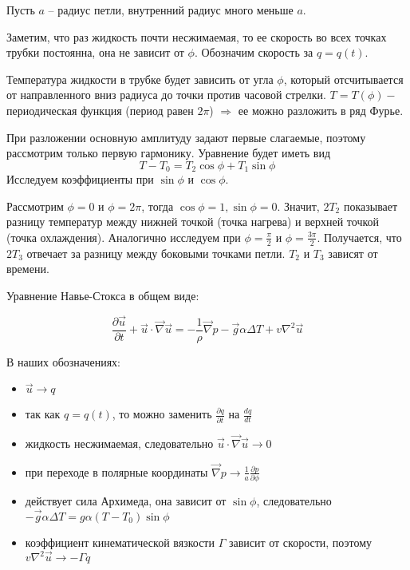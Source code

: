 \documentclass[12pt]{article}
\begin{document}

Пусть $a$ -- радиус петли, внутренний радиус много меньше $a$.

Заметим, что раз жидкость почти несжимаемая, то ее скорость во всех точках трубки постоянна, она не зависит от $\phi$. Обозначим скорость за $q = q(t)$.

Температура жидкости в трубке будет зависить от угла $\phi$, который отсчитывается от направленного вниз радиуса до точки против часовой стрелки. $T = T(\phi) -$ периодическая функция (период равен $2\pi$) $\Rightarrow$ ее можно разложить в ряд Фурье.

При разложении основную амплитуду задают первые слагаемые, поэтому рассмотрим только первую гармонику. Уравнение будет иметь вид 
\begin{equation}\label{eq1}
T - T_0 = T_2\cos\phi + T_1\sin\phi
\end{equation}
Исследуем коэффициенты при $\sin\phi$ и $\cos\phi$.

Рассмотрим $\phi = 0$ и $\phi = 2 \pi$, тогда $\cos\phi = 1, \sin\phi = 0$. Значит, $2T_2$ показывает разницу температур между нижней точкой (точка нагрева) и верхней точкой (точка охлаждения). Аналогично исследуем при $\phi = \frac{\pi}{2}$ и $\phi = \frac{3 \pi}{2}$. Получается, что $2T_3$ отвечает за разницу между боковыми точками петли. $T_2$ и $T_3$ зависят от времени.

Уравнение Навье-Стокса в общем виде:

\begin{equation*}
\frac{\partial \overrightarrow{u}}{\partial t} + \overrightarrow{u} \cdot \overrightarrow{\nabla} \overrightarrow{u} = -\frac{1}{\rho} \overrightarrow{\nabla} p - \overrightarrow{g} \alpha \Delta T + v \nabla^2 \overrightarrow{u}
\end{equation*}

В наших обозначениях:
\begin{itemize}
\item $\overrightarrow{u} \rightarrow q$
\item так как $q=q(t)$, то можно заменить $\frac{\partial q}{\partial t}$ на $\frac{dq}{dt}$
\item жидкость несжимаемая, следовательно $\overrightarrow{u} \cdot \overrightarrow{\nabla} \overrightarrow{u} \rightarrow 0$
\item при переходе в полярные координаты $\overrightarrow{\nabla} p \rightarrow \frac{1}{a} \frac{\partial p}{\partial \phi}$
\item действует сила Архимеда, она зависит от $\sin\phi$, следовательно $-\overrightarrow{g} \alpha \Delta T = g \alpha (T-T_0) \sin\phi$
\item коэффициент кинематической вязкости $\Gamma$ зависит от скорости, поэтому $v \nabla^2 \overrightarrow{u} \rightarrow -\Gamma q$
\end{itemize}
\end{document}
